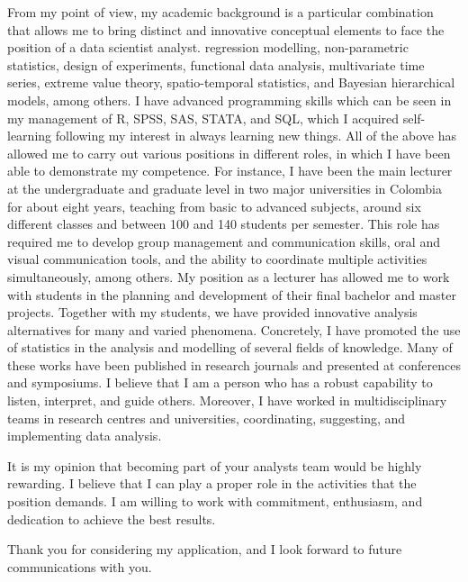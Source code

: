 \documentclass[11pt, a4paper]{awesome-cv}
\begin{document}
\begin{cvletter}
From my point of view, my academic background is a particular combination that allows me to bring distinct and innovative conceptual elements to face the position of a data scientist analyst. regression modelling, non-parametric statistics, design of experiments,  functional data analysis, multivariate time series, extreme value theory, spatio-temporal statistics, and  Bayesian hierarchical models, among others.  I have advanced programming skills which can be seen in my management of R, SPSS, SAS, STATA, and SQL, which I acquired self-learning following my interest in always learning new things. All of the above has allowed me to carry out various positions in different roles, in which I have been able to demonstrate my competence. For instance, I have been the main lecturer at the undergraduate and graduate level in two major universities in Colombia for about eight years, teaching from basic to advanced subjects, around six different classes and between 100 and 140 students per semester. This role has required me to develop group management and communication skills, oral and visual communication tools, and the ability to coordinate multiple activities simultaneously, among others. My position as a lecturer has allowed me to work with students in the planning and development of their final bachelor and master projects. Together with my students, we have provided innovative analysis alternatives for many and varied phenomena. Concretely, I have promoted the use of statistics in the analysis and modelling of several fields of knowledge. Many of these works have been published in research journals and presented at conferences and symposiums. I believe that I am a person who has a robust capability to listen, interpret, and guide others. Moreover, I have worked in multidisciplinary teams in research centres and universities, coordinating, suggesting, and implementing data analysis. \par
It is my opinion that becoming part of your analysts team would be highly rewarding. I believe that I can play a proper role in the activities that the position demands. I am willing to work with commitment, enthusiasm, and dedication to achieve the best results.\par
Thank you for considering my application, and I look forward to future communications with you.\par

 
\end{cvletter}


\makeletterclosing
\end{document}
